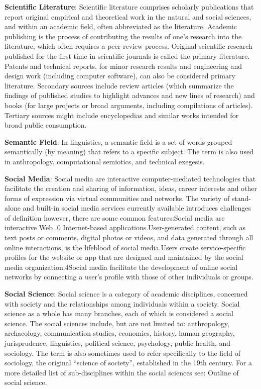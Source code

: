 \documentclass[b5paper,]{book}
\theoremstyle{definition}
\theoremstyle{definition}
\theoremstyle{definition}
\theoremstyle{remark}
\begin{document}
\textbf{Scientific Literature}: Scientific literature comprises
scholarly publications that report original empirical and theoretical
work in the natural and social sciences, and within an academic field,
often abbreviated as the literature. Academic publishing is the process
of contributing the results of one's research into the literature, which
often requires a peer-review process. Original scientific research
published for the first time in scientific journals is called the
primary literature. Patents and technical reports, for minor research
results and engineering and design work (including computer software),
can also be considered primary literature. Secondary sources include
review articles (which summarize the findings of published studies to
highlight advances and new lines of research) and books (for large
projects or broad arguments, including compilations of articles).
Tertiary sources might include encyclopedias and similar works intended
for broad public consumption.

\textbf{Semantic Field}: In linguistics, a semantic field is a set of
words grouped semantically (by meaning) that refers to a specific
subject. The term is also used in anthropology, computational semiotics,
and technical exegesis.

\textbf{Social Media}: Social media are interactive computer-mediated
technologies that facilitate the creation and sharing of information,
ideas, career interests and other forms of expression via virtual
communities and networks. The variety of stand-alone and built-in social
media services currently available introduces challenges of definition
however, there are some common features:Social media are interactive Web
.0 Internet-based applications.User-generated content, such as text
posts or comments, digital photos or videos, and data generated through
all online interactions, is the lifeblood of social media.Users create
service-specific profiles for the website or app that are designed and
maintained by the social media organization.4Social media facilitate the
development of online social networks by connecting a user's profile
with those of other individuals or groups.

\textbf{Social Science}: Social science is a category of academic
disciplines, concerned with society and the relationships among
individuals within a society. Social science as a whole has many
branches, each of which is considered a social science. The social
sciences include, but are not limited to: anthropology, archaeology,
communication studies, economics, history, human geography,
jurisprudence, linguistics, political science, psychology, public
health, and sociology. The term is also sometimes used to refer
specifically to the field of sociology, the original ``science of
society'', established in the 19th century. For a more detailed list of
sub-disciplines within the social sciences see: Outline of social
science.
\end{document}
